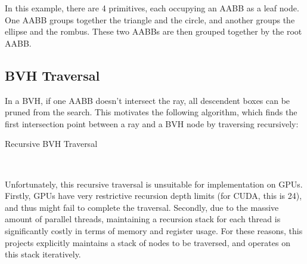 In this example, there are 4 primitives, each occupying an AABB as a leaf node. One AABB groups together the triangle and the circle, and another groups the ellipse and the rombus. These two AABBs are then grouped together by the root AABB.


\subsection{BVH Traversal}
In a BVH, if one AABB doesn't intersect the ray, all descendent boxes can be pruned from the search. This motivates the following algorithm, which finds the first intersection point between a ray and a BVH node by traversing recursively:

\begin{algorithm}[H]
    \label{algo bvh traversal recursive}
    \caption{Recursive BVH Traversal}
\end{algorithm} 

~

Unfortunately, this recursive traversal is unsuitable for implementation on GPUs. Firstly, GPUs have very restrictive recursion depth limits (for CUDA, this is 24), and thus might fail to complete the traversal. Secondly, due to the massive amount of parallel threads, maintaining a recursion stack for each thread is significantly costly in terms of memory and register usage. For these reasons, this projects explicitly maintains a stack of nodes to be traversed, and operates on this stack iteratively.

